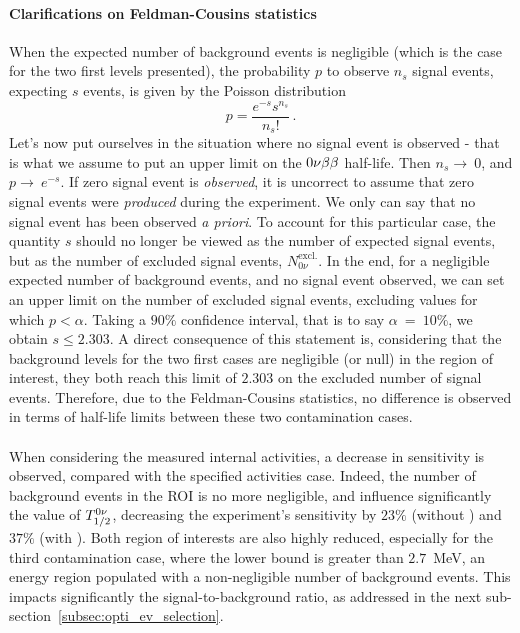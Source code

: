 \paragraph{Clarifications on Feldman-Cousins statistics}
When the expected number of background events is negligible (which is the case for the two first levels presented), the probability $p$ to observe $n_{s}$ signal events, expecting $s$ events, is given by the Poisson distribution
\begin{equation}
p = \frac{e^{-s}s^{n_{s}}}{n_{s}!}\,.
\end{equation}
Let's now put ourselves in the situation where no signal event is observed - that is what we assume to put an upper limit on the $0\nu\beta\beta$ half-life.
Then $n_{s}\rightarrow~0$, and $p\rightarrow~e^{-s}$.
If zero signal event is \emph{observed}, it is uncorrect to assume that zero signal events were \emph{produced} during the experiment.
We only can say that no signal event has been observed \emph{a priori}.
To account for this particular case, the quantity $s$ should no longer be viewed as the number of expected signal events, but as the number of excluded signal events, $N_{0\nu}^{\text{excl.}}$.
In the end, for a negligible expected number of background events, and no signal event observed, we can set an upper limit on the number of excluded signal events, excluding values for which $p < \alpha$.
Taking a $90\%$ confidence interval, that is to say $\alpha~=~10\%$, we obtain $s \leq 2.303$.
A direct consequence of this statement is, considering that the background levels for the two first cases are negligible (or null) in the region of interest, they both reach this limit of $2.303$ on the excluded number of signal events.
Therefore, due to the Feldman-Cousins statistics, no difference is observed in terms of half-life limits between these two contamination cases.

\paragraph{}
When considering the measured internal activities, a decrease in sensitivity is observed, compared with the specified activities case.
Indeed, the number of background events in the ROI is no more negligible, and influence significantly the value of $T_{1/2}^{0\nu}$, decreasing the experiment's sensitivity by $23\%$ (without \Bi) and $37\%$ (with \Bi).
Both region of interests are also highly reduced, especially for the third contamination case, where the lower bound is greater than $2.7$~MeV, an energy region populated with a non-negligible number of background events.
This impacts significantly the signal-to-background ratio, as addressed in the next sub-section~\ref{subsec:opti_ev_selection}.

